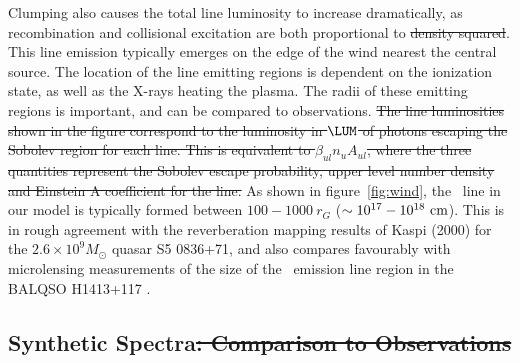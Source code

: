 \documentclass[preprint, a4paper, 11pt]{aastex}
\providecommand{\DIFadd}[1]{{\protect\color{blue}\uwave{#1}}} %
\providecommand{\DIFdel}[1]{{\protect\color{red}\sout{#1}}}                      %
\providecommand{\DIFaddbegin}{} %
\providecommand{\DIFaddend}{} %
\providecommand{\DIFdelbegin}{} %
\providecommand{\DIFdelend}{} %
\begin{document}
Clumping also causes the total line luminosity to increase dramatically,
as recombination and collisional excitation are both proportional to
\DIFdelbegin \DIFdel{density squared}\DIFdelend \DIFaddbegin \DIFadd{$n_e^2$}\DIFaddend . This line emission typically emerges on the edge of the wind
nearest the central source. The location of the line emitting regions
is dependent on the ionization state, as well as the X-rays heating the plasma.
The radii of these emitting regions is important,
and can be compared to observations. \DIFdelbegin \DIFdel{The line luminosities 
shown in the figure correspond to the luminosity in $\LUM$ of photons
escaping the Sobolev region for each line. 
This is equivalent to $\beta_{ul} n_u A_{ul}$, where the three quantities
represent the Sobolev escape probability, upper level number density and 
Einstein A coefficient for the line. 
}\DIFdelend As shown in figure~\ref{fig:wind},
the \civ\ line in our model is typically formed between 
$100-1000~r_G$ ($\sim10^{17}-10^{18}~\rm{cm}$).
This is in rough agreement with the reverberation mapping 
results of Kaspi (2000) for the $2.6\times10^{9} M_\odot$ quasar S5 0836+71,
and also compares favourably with microlensing measurements of the size of the
\civ\ emission line region in the BALQSO H1413+117 \citep{odowd2015}.




\subsection{Synthetic Spectra\DIFdelbegin \DIFdel{: Comparison to Observations}\DIFdelend }
\end{document}
